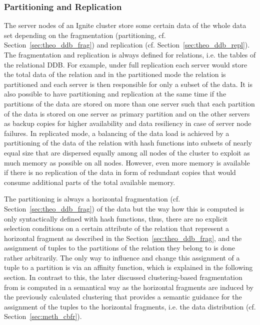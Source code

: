 \subsubsection{Partitioning and Replication}
\label{sec:meth_ign_panre}
The server nodes of an Ignite cluster store some certain data of the whole data set depending on the fragmentation (partitioning, cf.
Section~\ref{sec:theo_ddb_frag}) and replication (cf. Section~\ref{sec:theo_ddb_repl}). The fragmentation and replication is always defined for relations,
i.e. the tables of the relational DDB. For example, under full replication each server would store the total data of the relation and in the partitioned 
mode the relation is partitioned and each server is then responsible for only a subset of the data. It is also possible to have partitioning and 
replication at the same time if the partitions of the data are stored on more than one server such that each partition of the data is stored on one 
server as primary partition and on the other servers as backup copies for higher availability and data resiliency in case of server node failures. 
In replicated mode, a balancing of the data load is achieved by a partitioning of the data of the relation with hash functions into subsets of nearly 
equal size that are dispersed equally among all nodes of the cluster to exploit as much memory as possible on all nodes. However, even more memory is
available if there is no replication of the data in form of redundant copies that would consume additional parts of the total available memory. 

The partitioning is always a horizontal fragmentation (cf. Section~\ref{sec:theo_ddb_frag}) of the data but the way how this is computed is only syntactically
defined with hash functions, thus, there are no explicit selection conditions on a certain attribute of the relation that represent a horizontal fragment as
described in the Section~\ref{sec:theo_ddb_frag}, and the assignment of tuples to the partitions of the relation they belong to is done rather arbitrarily.
The only way to influence and change this assignment of a tuple to a partition is via an affinity function, which is explained in the following section.
In contrast to this, the later discussed clustering-based fragmentation from \citet{Wiese2014} is computed in a semantical way as the horizontal fragments are
induced by the previously calculated clustering that provides a semantic guidance for the assignment of the tuples to the horizontal fragments, i.e. the data 
distribution (cf. Section~\ref{sec:meth_cbfr}). 



